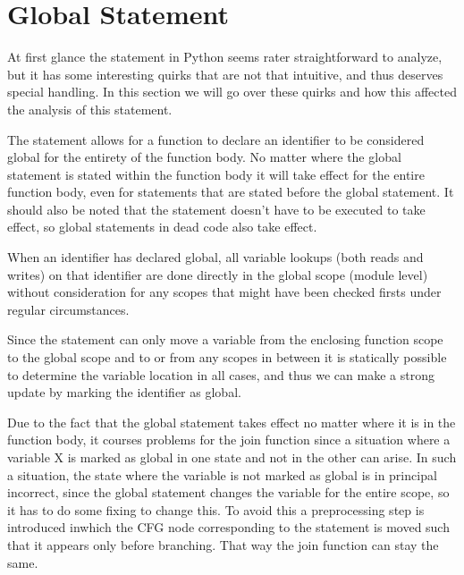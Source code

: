 \chapter{Global Statement}
At first glance the  statement in Python seems rater straightforward to analyze, but it has some interesting quirks that are not that intuitive, and thus deserves special handling. In this section we will go over these quirks and how this affected the analysis of this statement.

The statement allows for a function to declare an identifier to be considered global for the entirety of the function body. No matter where the global statement is stated within the function body it will take effect for the entire function body, even for statements that are stated before the global statement. It should also be noted that the statement doesn't have to be executed to take effect, so global statements in dead code also take effect.

When an identifier has declared global, all variable lookups (both reads and writes) on that identifier are done directly in the global scope (module level) without consideration for any scopes that might have been checked firsts under regular circumstances.

Since the  statement can only move a variable from the enclosing function scope to the global scope and to or from any scopes in between it is statically possible to determine the variable location in all cases, and thus we can make a strong update by marking the identifier as global. 

Due to the fact that the global statement takes effect no matter where it is in the function body, it courses problems for the join function since a situation where a variable X is marked as global in one state and not in the other can arise. In such a situation, the state where the variable is not marked as global is in principal incorrect, since the global statement changes the variable for the entire scope, so it has to do some fixing to change this. To avoid this a preprocessing step is introduced inwhich the CFG node corresponding to the  statement is moved such that it appears only before branching. That way the join function can stay the same.


